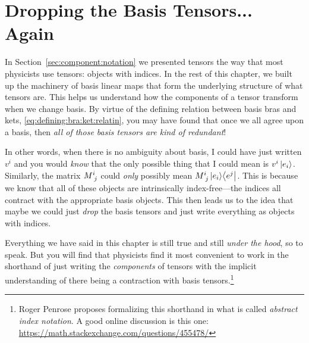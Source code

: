 \documentclass[12pt, oneside]{report}    %
\let\oldsection\section
\def\section{%
  \setcounter{sidenote}{1}%
  \oldsection
}
\begin{document}
\section{Dropping the Basis Tensors... Again}

In Section~\ref{sec:component:notation} we presented tensors the way that most physicists use tensors: objects with indices. In the rest of this chapter, we built up the machinery of basis linear maps that form the underlying structure of what tensors are. This helps us understand how the components of a tensor transform when we change basis. By virtue of the defining relation between basis bras and kets, \eqref{eq:defining:bra:ket:relatin}, you may have found that once we all agree upon a basis, then \emph{all of those basis tensors are kind of redundant}!

In other words, when there is no ambiguity about basis, I could have just written $v^i$ and you would \emph{know} that the only possible thing that I could mean is $v^i\left|e_i\right\rangle$. Similarly, the matrix $M\aij{i}{j}$ could \emph{only} possibly mean $M\aij{i}{j}\ket{e_i}\!\bra{e^j}$. This is because we know that all of these objects are intrinsically index-free---the indices all contract with the appropriate basis objects. This then leads us to the idea that maybe we could just \emph{drop} the basis tensors and just write everything as objects with indices.

Everything we have said in this chapter is still true and still \emph{under the hood}, so to speak. But you will find that physicists find it most convenient to work in the shorthand of just writing the \emph{components} of tensors with the implicit understanding of there being a contraction with basis tensors.\footnote{Roger Penrose proposes formalizing this shorthand in what is called \emph{abstract index notation}. A good online discussion is this one: \url{https://math.stackexchange.com/questions/455478/}} 
\end{document}
